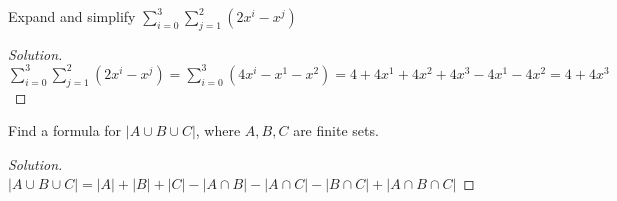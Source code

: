 \documentclass[crop=false,class=book,oneside]{standalone}
\begin{document}
\begin{problem}
Expand and simplify $\sum_{i=0}^{3}\sum_{j=1}^{2}(2x^i-x^j)$
\end{problem}
\begin{proof}[Solution]
\vspace{-0.5\topsep}
$\sum_{i=0}^{3}\sum_{j=1}^{2}(2x^i-x^j)=\sum_{i=0}^{3}(4x^{i}-x^{1}-x^{2})=4+4x^{1}+4x^{2}+4x^{3}-4x^{1}-4x^{2}=4+4x^3$
\end{proof}
\begin{problem}
Find a formula for $|A\cup B\cup C|$, where $A,B,C$ are finite sets.
\end{problem}
\begin{proof}[Solution]
\vspace{-0.5\topsep}
$|A\cup B\cup C| = |A|+|B|+|C|-|A\cap B|-|A\cap C|-|B\cap C| +|A\cap B \cap C|$
\end{proof}
\end{document}
